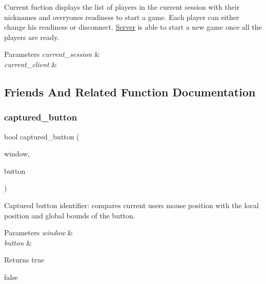 Current fuction displays the list of players in the current session with their nicknames and overyone\textquotesingle{}s readiness to start a game. Each player can either change his readiness or disconnect. \hyperlink{classServer}{Server} is able to start a new game once all the players are ready. 


\begin{DoxyParams}{Parameters}
{\em current\+\_\+session} & \\
\hline
{\em current\+\_\+client} & \\
\hline
\end{DoxyParams}


\subsection{Friends And Related Function Documentation}
\mbox{\label{classMenu_a46f7d09cf27de9dcc1580cfd6d2f05d5}} 
\subsubsection{\texorpdfstring{captured\+\_\+button}{captured\_button}}
{\footnotesize\ttfamily bool captured\+\_\+button (\begin{DoxyParamCaption}\item[{Render\+Window \&}]{window,  }\item[{Text \&}]{button }\end{DoxyParamCaption})\hspace{0.3cm}{\ttfamily [friend]}}



Captured button identifier\+: compares current user\textquotesingle{}s mouse position with the local position and global bounds of the button. 


\begin{DoxyParams}{Parameters}
{\em window} & \\
\hline
{\em button} & \\
\hline
\end{DoxyParams}
\begin{DoxyReturn}{Returns}
true 

false 
\end{DoxyReturn}
\mbox{\label{classMenu_a17db731fc4056230798f5164a4e9d7da}} 
